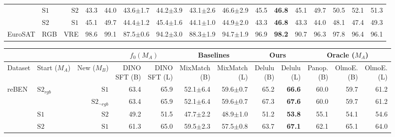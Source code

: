 \begin{tabular}{llr | r r r r r r r r r r r r r}
   & $\mathrm{S1}$ & $\mathrm{S2}$ & 43.3 & 44.0 & 43.6$\pm$1.7 & 44.2$\pm$3.9 & 43.1$\pm$2.6 & 46.6$\pm$2.9 & 45.5 & \textbf{46.8} & 45.1 & 49.7 & 50.5 & 52.1 & 51.3 \\
   & $\mathrm{S2}$ & $\mathrm{S1}$ & 45.1 & 49.7 & 44.4$\pm$1.2 & 45.4$\pm$1.6 & 44.1$\pm$1.0 & 44.9$\pm$2.0 & 43.3 & \textbf{46.8} & 43.3 & 44.0 & 48.1 & 47.4 & 49.3 \\
  \midrule
  EuroSAT & RGB & VRE & 98.6 & 99.1 & 87.5$\pm$0.6 & 94.2$\pm$3.0 & 88.3$\pm$1.9 & 94.7$\pm$1.9 & 96.9 & \textbf{98.2} & 90.7 & 96.3 & 97.8 & 96.4 & 96.1 \\
\bottomrule
\end{tabular}

\bigskip

\begin{tabular}{llr | r r r r r r r r r}
\toprule
\multicolumn{3}{c}{} & \multicolumn{2}{c|}{$f_0(M_A)$} & \multicolumn{2}{c|}{Baselines} & \multicolumn{2}{c|}{Ours} & \multicolumn{3}{c}{Oracle ($M_A$)} \\
\midrule
Dataset & \shortstack[c]{Start\\($M_A$)} & \shortstack[c]{New\\($M_B$)} & \shortstack[c]{DINO\\SFT (B)} & \shortstack[c]{DINO\\SFT (L)} & \shortstack[c]{MixMatch\\(B)} & \shortstack[c]{MixMatch\\(L)} & \shortstack[c]{Delulu\\(B)} & \shortstack[c]{Delulu\\(L)} & \shortstack[c]{Panop.\\(B)} & \shortstack[c]{OlmoE.\\(B)} & \shortstack[c]{OlmoE.\\(L)} \\
\midrule
  \multirow{4}{*}{reBEN} & \multirow{2}{*}{$\mathrm{S2}_{rgb}$} & $\mathrm{S1}$ & 63.4 & 65.9 & 52.1$\pm$6.4 & 59.6$\pm$0.7 & 65.2 & \textbf{66.6} & 60.0 & 59.7 & 61.2 \\
   &  & $\mathrm{S2}_{\neg rgb}$ & 63.4 & 65.9 & 52.1$\pm$6.4 & 59.6$\pm$0.7 & 67.3 & \textbf{67.6} & 60.0 & 59.7 & 61.2 \\
   & $\mathrm{S1}$ & $\mathrm{S2}$ & 49.2 & 51.5 & 47.7$\pm$2.2 & 48.9$\pm$1.0 & 51.2 & \textbf{53.8} & 55.1 & 54.1 & 54.6 \\
   & $\mathrm{S2}$ & $\mathrm{S1}$ & 61.3 & 65.0 & 59.5$\pm$2.3 & 57.5$\pm$0.8 & 63.7 & \textbf{67.1} & 62.1 & 65.1 & 64.0 \\

\end{tabular}
